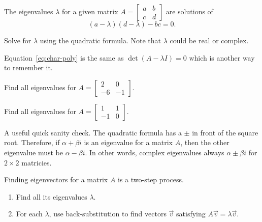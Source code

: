 \documentclass[../main.tex]{subfiles}
\begin{document}
\begin{method} \label{method:eigenvalues}
  The eigenvalues \(\lambda\) for a given matrix \(A = \begin{bmatrix}a & b \\ c & d \end{bmatrix}\) are solutions of
  \begin{equation} \label{eq:char-poly}
    (a - \lambda)(d - \lambda) - bc = 0.
  \end{equation}

  Solve for \(\lambda\) using the quadratic formula. Note that \(\lambda\) could be real or complex.
\end{method}
Equation~\eqref{eq:char-poly} is the same as \(\det(A - \lambda I) = 0\) which is another way to remember it.

\begin{example} \label{ex:eigenvalues-real}
  Find all eigenvalues for \(A = \begin{bmatrix} 2 & 0 \\ -6 & -1 \end{bmatrix}\).
\end{example}

\begin{example} \label{ex:eigenvalues-complex}
  Find all eigenvalues for \(A = \begin{bmatrix} 1 & 1 \\ -1 & 0 \end{bmatrix}\).
\end{example}

{\footnotesize \faExclamationTriangle{} A useful quick sanity check. The quadratic formula has a \(\pm\) in front of the square root. Therefore, if \(\alpha + \beta i\) is an eigenvalue for a matrix \(A\), then the other eigenvalue must be \(\alpha - \beta i\).  In other words, complex eigenvalues always  \(\alpha \pm \beta i\) for \(2 \times 2\) matricies.}
\clearpage

\begin{method} \label{method:eigenvectors}
  Finding eigenvectors for a matrix \(A\) is a two-step process.
  \begin{enumerate}
    \item Find all its eigenvalues \(\lambda\). 
    \item For each \(\lambda\), use back-substitution to find vectors \(\vec{v}\) satisfying \(A \vec{v} = \lambda \vec{v}\). 
  \end{enumerate}
\end{method}
\end{document}
